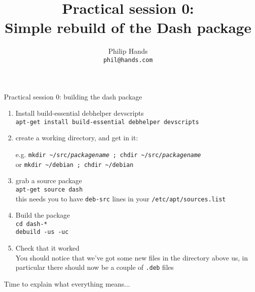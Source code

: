 \documentclass[10pt,final]{beamer}
\title[Practical session 0: dash]{Practical session 0:\\ Simple rebuild of the Dash package}
\author[]{Philip Hands\\{\small\texttt{phil@hands.com}}}
\institute{\texttt{[image: figs/openlogo-nd.pdf]}}
\date{}
\begin{document}
\frame{\titlepage}

\begin{frame}{Practical session 0: building the dash package}
\begin{enumerate}
\item Install build-essential debhelper devscripts\\
  {\small \texttt{apt-get install build-essential debhelper devscripts}}
  \hbr
\item create a working directory, and get in it:\\
  \begin{tabbing}
    e.g. \= \texttt{mkdir \textasciitilde/src/\textsl{packagename} ; chdir \textasciitilde/src/\textsl{packagename}}\\
    or   \> \texttt{mkdir \textasciitilde/debian ; chdir \textasciitilde/debian}
  \end{tabbing}
  
\item grab a source package\\
  \texttt{apt-get source dash}\\ 
  {\small this needs you to have \texttt{deb-src} lines in your \texttt{/etc/apt/sources.list}}
\item Build the package\\
  {\small \texttt{cd dash-*\\ debuild -us -uc}}

\item Check that it worked\\
  {\small You should notice that we've got some new
    files in the directory above us, in particular
    there should now be a couple of \texttt{.deb}
    files}
\end{enumerate}

Time to explain what everything means...
\end{frame}
\end{document}
